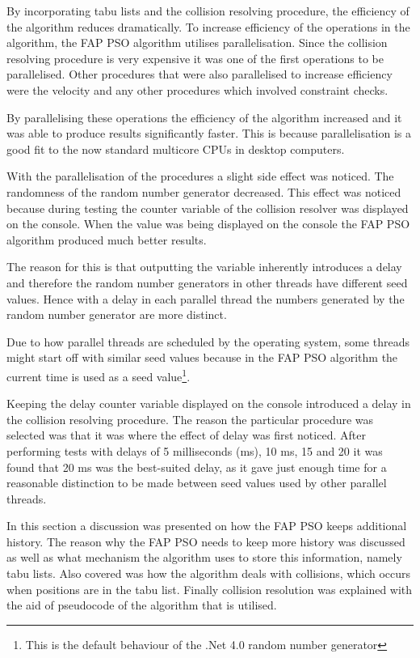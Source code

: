By incorporating tabu lists and the collision resolving procedure, the efficiency of the algorithm reduces dramatically. To increase efficiency of the operations in the algorithm, the \gls{FAP} \gls{PSO} algorithm utilises parallelisation. Since the collision resolving procedure is very expensive it was one of the first operations to be parallelised. Other procedures that were also parallelised to increase efficiency were the velocity and any other procedures which involved constraint checks.

By parallelising these operations the efficiency of the algorithm increased and it was able to produce results significantly faster. This is because parallelisation is a good fit to the now standard multicore CPUs in desktop computers.

With the parallelisation of the procedures a slight side effect was noticed. The randomness of the random number generator decreased. This effect was noticed because during testing the counter variable of the collision resolver was displayed on the console. When the value was being displayed on the console the \gls{FAP} \gls{PSO} algorithm produced much better results. 

The reason for this is that outputting the variable inherently introduces a delay and therefore the random number generators in other threads have different seed values. Hence with a delay in each parallel thread the numbers generated by the random number generator are more distinct. 

Due to how parallel threads are scheduled by the operating system, some threads might start off with similar seed values because in  the \gls{FAP} \gls{PSO} algorithm the current time is used as a seed value\footnote{This is the default behaviour of the .Net 4.0 random number generator}.

Keeping the delay counter variable displayed on the console introduced a delay in the collision resolving procedure. The reason the particular procedure was selected was that it was where the effect of delay was first noticed. After performing tests with delays of 5 milliseconds (ms), 10 ms, 15 and 20 it was found that 20 ms was the best-suited delay, as it gave just enough time for a reasonable distinction to be made between seed values used by other parallel threads.

In this section a discussion was presented on how the \gls{FAP} \gls{PSO} keeps additional history. The reason why the \gls{FAP} \gls{PSO} needs to keep more history was discussed as well as what mechanism the algorithm uses to store this information, namely tabu lists. Also covered was how the algorithm deals with collisions, which occurs when positions are in the tabu list. Finally collision resolution was explained with the aid of pseudocode of the algorithm that is utilised.

